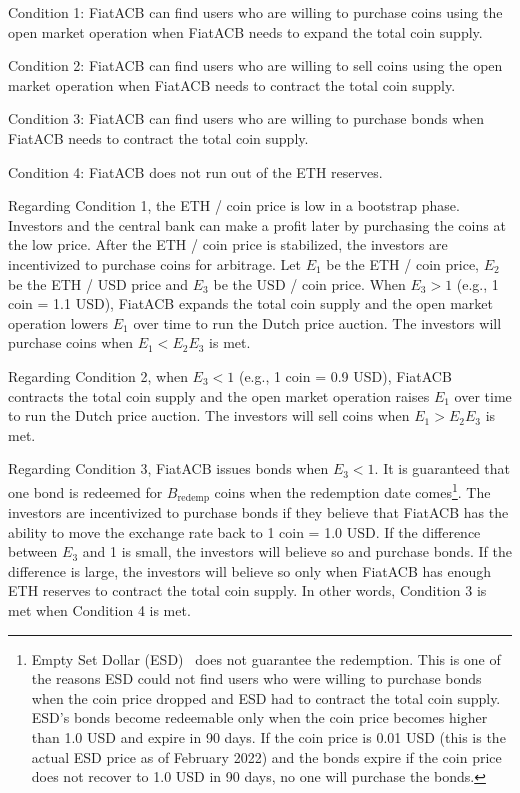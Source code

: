 \documentclass[dvipdfmx,a4paper]{article}
\begin{document}
\begin{description}
\item{Condition 1}: FiatACB can find users who are willing to purchase coins using the open market operation when FiatACB needs to expand the total coin supply.
\item{Condition 2}: FiatACB can find users who are willing to sell coins using the open market operation when FiatACB needs to contract the total coin supply.
\item{Condition 3}: FiatACB can find users who are willing to purchase bonds when FiatACB needs to contract the total coin supply.
\item{Condition 4}: FiatACB does not run out of the ETH reserves.
\end{description}

Regarding Condition 1, the ETH / coin price is low in a bootstrap phase. Investors and the central bank can make a profit later by purchasing the coins at the low price. After the ETH / coin price is stabilized, the investors are incentivized to purchase coins for arbitrage. Let $E_1$ be the ETH / coin price, $E_2$ be the ETH / USD price and $E_3$ be the USD / coin price. When $E_3>1$ (e.g., 1 coin = 1.1 USD), FiatACB expands the total coin supply and the open market operation lowers $E_1$ over time to run the Dutch price auction. The investors will purchase coins when $E_1<E_2E_3$ is met.

Regarding Condition 2, when $E_3<1$ (e.g., 1 coin = 0.9 USD), FiatACB contracts the total coin supply and the open market operation raises $E_1$ over time to run the Dutch price auction. The investors will sell coins when $E_1>E_2E_3$ is met.

Regarding Condition 3, FiatACB issues bonds when $E_3<1$. It is guaranteed that one bond is redeemed for $B_{\mathrm{redemp}}$ coins when the redemption date comes\footnote{Empty Set Dollar (ESD)~\cite{emptysetdollar} does not guarantee the redemption. This is one of the reasons ESD could not find users who were willing to purchase bonds when the coin price dropped and ESD had to contract the total coin supply. ESD's bonds become redeemable only when the coin price becomes higher than 1.0 USD and expire in 90 days. If the coin price is 0.01 USD (this is the actual ESD price as of February 2022) and the bonds expire if the coin price does not recover to 1.0 USD in 90 days, no one will purchase the bonds.}. The investors are incentivized to purchase bonds if they believe that FiatACB has the ability to move the exchange rate back to 1 coin = 1.0 USD. If the difference between $E_3$ and 1 is small, the investors will believe so and purchase bonds. If the difference is large, the investors will believe so only when FiatACB has enough ETH reserves to contract the total coin supply. In other words, Condition 3 is met when Condition 4 is met.
\end{document}
